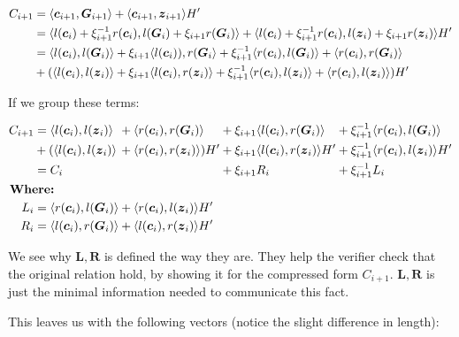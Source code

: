 \documentclass[
]{article}
\renewcommand{\vec}[1]{ \boldsymbol{#1} }
\newcommand{\ip}[2]{ \langle #1, #2 \rangle }
\begin{document}
\[
\begin{alignedat}[b]{1}
  C_{i+1} &= \ip{\vec{c}_{i+1}}{\vec{G}_{i+1}} + \ip{\vec{c}_{i+1}}{\vec{z}_{i+1}} H'\\ 
          &= \ip{l(\vec{c}_i) + \xi^{-1}_{i+1} r(\vec{c}_i)}{l(\vec{G}_i) + \xi_{i+1} r(\vec{G}_i)} 
            + \ip{l(\vec{c}_i) + \xi^{-1}_{i+1} r(\vec{c}_i)}{l(\vec{z}_i) + \xi_{i+1} r(\vec{z}_i)} H'\\
          &= \ip{l(\vec{c}_i)}{l(\vec{G}_i)} + \xi_{i+1} \ip{l(\vec{c}_i))}{r(\vec{G}_i}
            + \xi^{-1}_{i+1} \ip{r(\vec{c}_i)}{l(\vec{G}_i)} + \ip{r(\vec{c}_i)}{r(\vec{G}_i)}\\
          &+ (\ip{l(\vec{c}_i)}{l(\vec{z}_i)} + \xi_{i+1} \ip{l(\vec{c}_i)}{r(\vec{z}_i)} 
            + \xi^{-1}_{i+1} \ip{r(\vec{c}_i)}{l(\vec{z}_i)} + \ip{r(\vec{c}_i)}{l(\vec{z}_i)}) H'
\end{alignedat}
\]

If we group these terms:

\[
\begin{alignedat}[b]{4}
  C_{i+1} &= \ip{l(\vec{c}_i)}{l(\vec{z}_i)}  &&+ \ip{r(\vec{c}_i)}{r(\vec{G}_i)}     &&+ \xi_{i+1} \ip{l(\vec{c}_i)}{r(\vec{G}_i)}    &&+ \xi^{-1}_{i+1} \ip{r(\vec{c}_i)}{l(\vec{G}_i)} \\
          &+ (\ip{l(\vec{c}_i)}{l(\vec{z}_i)} &&+ \ip{r(\vec{c}_i)}{r(\vec{z}_i)}) H' &&+ \xi_{i+1} \ip{l(\vec{c}_i)}{r(\vec{z}_i)} H' &&+ \xi^{-1}_{i+1} \ip{r(\vec{c}_i)}{l(\vec{z}_i)} H' \\
          &= C_i                              &&                                      &&+ \xi_{i+1} R_i                                &&+ \xi^{-1}_{i+1} L_i \\
          &\mkern-18mu\mkern-18mu \textbf{Where:} && && && \\
  L_i     &= \ip{r(\vec{c}_i)}{l(\vec{G}_i)} &&+ \ip{r(\vec{c}_i)}{l(\vec{z}_i)} H' && && \\
  R_i     &= \ip{l(\vec{c}_i)}{r(\vec{G}_i)} &&+ \ip{l(\vec{c}_i)}{r(\vec{z}_i)} H' && && 
\end{alignedat}
\]

We see why \(\vec{L}, \vec{R}\) is defined the way they are. They help
the verifier check that the original relation hold, by showing it for
the compressed form \(C_{i+1}\). \(\vec{L}, \vec{R}\) is just the
minimal information needed to communicate this fact.

This leaves us with the following vectors (notice the slight difference
in length):
\end{document}
